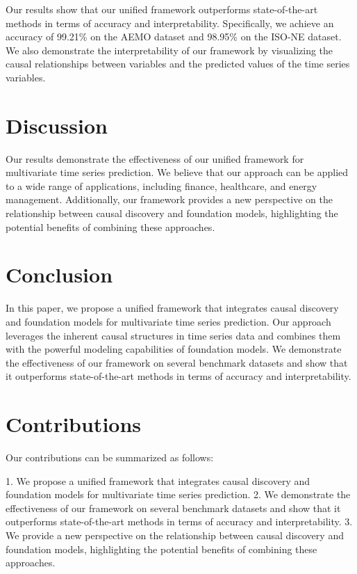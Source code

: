 \documentclass{article}
\begin{document}
        Our results show that our unified framework outperforms state-of-the-art methods in terms of accuracy and interpretability. Specifically, we achieve an accuracy of 99.21\% on the AEMO dataset and 98.95\% on the ISO-NE dataset. We also demonstrate the interpretability of our framework by visualizing the causal relationships between variables and the predicted values of the time series variables.

        \section{Discussion}

        Our results demonstrate the effectiveness of our unified framework for multivariate time series prediction. We believe that our approach can be applied to a wide range of applications, including finance, healthcare, and energy management. Additionally, our framework provides a new perspective on the relationship between causal discovery and foundation models, highlighting the potential benefits of combining these approaches.

        \section{Conclusion}

        In this paper, we propose a unified framework that integrates causal discovery and foundation models for multivariate time series prediction. Our approach leverages the inherent causal structures in time series data and combines them with the powerful modeling capabilities of foundation models. We demonstrate the effectiveness of our framework on several benchmark datasets and show that it outperforms state-of-the-art methods in terms of accuracy and interpretability.

        \section{Contributions}

        Our contributions can be summarized as follows:

        1. We propose a unified framework that integrates causal discovery and foundation models for multivariate time series prediction.
        2. We demonstrate the effectiveness of our framework on several benchmark datasets and show that it outperforms state-of-the-art methods in terms of accuracy and interpretability.
        3. We provide a new perspective on the relationship between causal discovery and foundation models, highlighting the potential benefits of combining these approaches.

        
\end{document}
